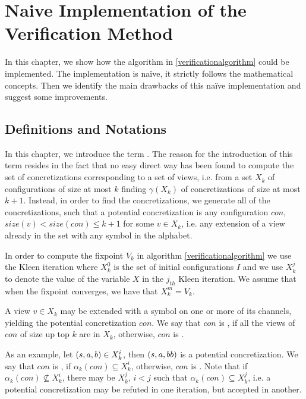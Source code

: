 \section{Naive Implementation of the Verification Method}
\label{naive}
In this chapter, we show how the algorithm in \ref{verificationalgorithm} could be implemented. The implementation is naïve, it strictly follows the mathematical concepts. Then we identify the main drawbacks of this naïve implementation and suggest some improvements.

\subsection{Definitions and Notations}
In this chapter, we introduce the term . The reason for the introduction of this term resides in the fact that no easy direct way has been found to compute the set of concretizations corresponding to a set of views, i.e. from a set $X_k$ of configurations of size at most $k$ finding $\gamma(X_k)$ of concretizations of size at most $k+1$. Instead, in order to find the concretizations, we generate all of the  concretizations, such that a potential concretization is any configuration $con$, $size(v) < size(con) \leq k+1$ for some $v \in X_k$, i.e. any extension of a view already in the set with any symbol in the alphabet.

In order to compute the fixpoint $V_k$ in algorithm \ref{verificationalgorithm} we use the Kleen iteration where $X_k^0$ is the set of initial configurations $I$ and we use $X_k^j$ to denote the value of the variable $X$ in the $j_{th}$ Kleen iteration. We assume that when the fixpoint converges, we have that $X_k^m=V_k$.

 
A view $v\in X_k$ may be extended with a symbol on one or more of its channels, yielding the potential concretization $con$. We say that $con$ is , if all the views of $con$ of size up top $k$ are in $X_k$, otherwise, $con$ is . 

As an example, let $(s, a, b) \in X_k^i$, then $(s, a, bb)$ is a potential concretization. We say that $con$ is , if $\alpha_k(con) \subseteq X_k^i$, otherwise, $con$ is . Note that if $\alpha_k(con) \not\subseteq X_k^i$, there may be $X_k^j$, $i < j$ such that $\alpha_k(con) \subseteq X_k^j$, i.e. a potential concretization may be refuted in one iteration, but accepted in another.

